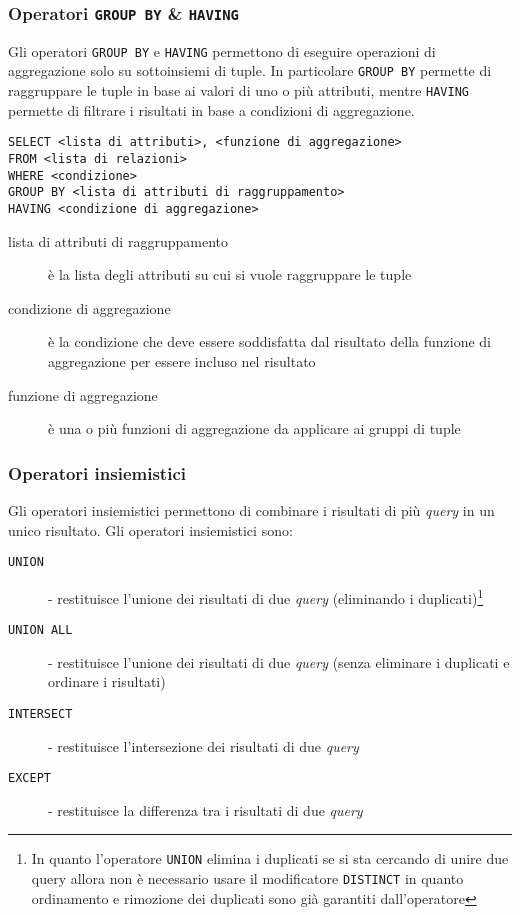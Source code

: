         \subsubsection{Operatori \texttt{GROUP BY} \& \texttt{HAVING}}
            Gli operatori \texttt{GROUP BY} e \texttt{HAVING} permettono di eseguire operazioni di aggregazione solo su sottoinsiemi di tuple.
            In particolare \texttt{GROUP BY} permette di raggruppare le tuple in base ai valori di uno o più attributi, mentre \texttt{HAVING} permette di filtrare i risultati in base a condizioni di aggregazione.
            \begin{lstlisting}
SELECT <lista di attributi>, <funzione di aggregazione>
FROM <lista di relazioni>
WHERE <condizione>
GROUP BY <lista di attributi di raggruppamento>
HAVING <condizione di aggregazione>
            \end{lstlisting}
            \begin{description}
                \item[\<lista di attributi di raggruppamento\>] è la lista degli attributi su cui si vuole raggruppare le tuple
                \item[\<condizione di aggregazione\>] è la condizione che deve essere soddisfatta dal risultato della funzione di aggregazione per essere incluso nel risultato
                \item[\<funzione di aggregazione\>] è una o più funzioni di aggregazione da applicare ai gruppi di tuple
            \end{description}
        \subsubsection{Operatori insiemistici}
            Gli operatori insiemistici permettono di combinare i risultati di più \textit{query} in un unico risultato. Gli operatori insiemistici sono:
            \begin{description}
                \item[\texttt{UNION}] - restituisce l'unione dei risultati di due \textit{query} (eliminando i duplicati)\footnote{In quanto l'operatore \texttt{UNION} elimina i duplicati se si sta cercando di unire due query allora non è necessario usare il modificatore \texttt{DISTINCT} in quanto ordinamento e rimozione dei duplicati sono già garantiti dall'operatore}
                \item[\texttt{UNION ALL}] - restituisce l'unione dei risultati di due \textit{query} (senza eliminare i duplicati e ordinare i risultati)
                \item[\texttt{INTERSECT}] - restituisce l'intersezione dei risultati di due \textit{query}
                \item[\texttt{EXCEPT}] - restituisce la differenza tra i risultati di due \textit{query}
            \end{description}
